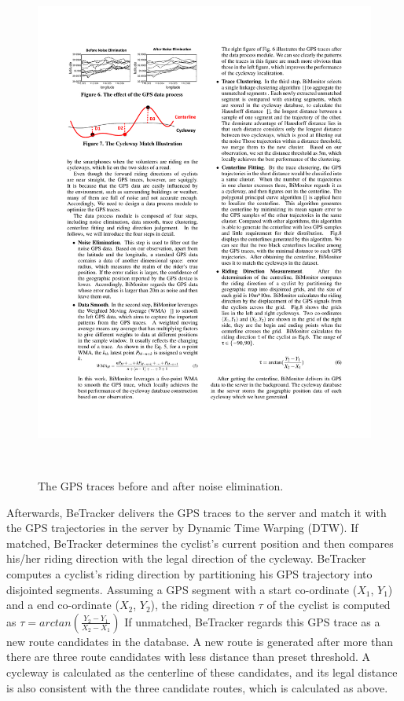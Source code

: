 \documentclass{sigchi-ext}
\def\sysname{BeTracker }
\begin{document}
\begin{figure}[h]
	\includegraphics[width=0.9\columnwidth]{figures/GPS_trace.pdf}
	\caption{The GPS traces before and after noise elimination.}~\label{fig:gps_trace}
\end{figure}
%
Afterwards, \sysname delivers the GPS traces to the server and match it with the GPS trajectories in the server by Dynamic Time Warping (DTW). If matched, \sysname determines the cyclist's current position and then compares his/her riding direction with the legal direction of the cycleway.  \sysname computes a cyclist's riding direction by partitioning his GPS trajectory into disjointed segments. Assuming a GPS segment with a start co-ordinate ($X_{1}$, $Y_{1}$) and a end co-ordinate ($X_{2}$, $Y_{2}$), the riding direction $\tau$ of the cyclist is computed as $\tau=arctan(\frac{Y_{2}-Y_{1}}{X_{2}-X_{1}})$
If unmatched, \sysname regards this GPS trace as a new route candidates in the database. A new route is generated after more than there are three route candidates with less distance than preset threshold. A cycleway is calculated as the centerline of these candidates, and its legal distance is also consistent with the three candidate routes, which is calculated as above.  
%
\end{document}
